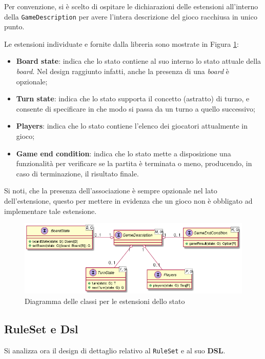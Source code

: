 Per convenzione, si è scelto di ospitare le dichiarazioni delle estensioni all'interno della \texttt{GameDescription} per avere l'intera descrizione del gioco racchiusa in unico punto.

Le estensioni individuate e fornite dalla libreria sono mostrate in Figura \ref{fig:extensions}:
%
\begin{itemize}
    \item \textbf{Board state}: indica che lo stato contiene al suo interno lo stato attuale della \textit{board}. Nel design raggiunto infatti, anche la presenza di una \textit{board} è opzionale;
    \item \textbf{Turn state}: indica che lo stato supporta il concetto (astratto) di turno, e consente di specificare in che modo si passa da un turno a quello successivo;
    \item \textbf{Players}: indica che lo stato contiene l'elenco dei giocatori attualmente in gioco;
    \item \textbf{Game end condition}: indica che lo stato mette a disposizione una funzionalità per verificare se la partita è terminata o meno, producendo, in caso di terminazione, il risultato finale.
\end{itemize}
%
Si noti, che la presenza dell'associazione è sempre opzionale nel lato dell'estensione, questo per mettere in evidenza che un gioco non è obbligato ad implementare tale estensione.
%
\begin{figure}
    \centering
    \includegraphics[width=\linewidth]{images/uml/extensions.png}
    \caption{Diagramma delle classi per le estensioni dello stato}
    \label{fig:extensions}
\end{figure}

\subsection{RuleSet e Dsl}

Si analizza ora il design di dettaglio relativo al \texttt{RuleSet} e al suo \textbf{DSL}.

